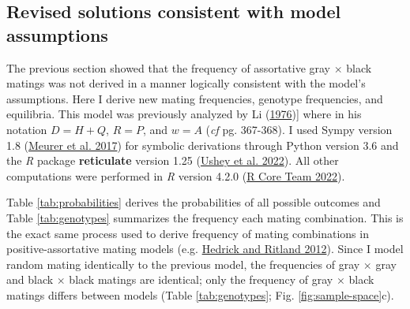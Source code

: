 \documentclass[
]{article}
\begin{document}
\hypertarget{revised-solutions-consistent-with-model-assumptions}{%
\subsection{Revised solutions consistent with model assumptions}\label{revised-solutions-consistent-with-model-assumptions}}

The previous section showed that the frequency of assortative gray \(\times\) black matings was not derived in a manner logically consistent with the model's assumptions. Here I derive new mating frequencies, genotype frequencies, and equilibria. This model was previously analyzed by Li (\protect\hyperlink{ref-li_first_1976}{1976}){]} where in his notation \(D = H + Q\), \(R = P\), and \(w = A\) (\emph{cf} pg. 367-368). I used Sympy version 1.8 (\protect\hyperlink{ref-meurer_sympy:_2017}{Meurer et al. 2017}) for symbolic derivations through Python version 3.6 and the \emph{R} package \textbf{reticulate} version 1.25 (\protect\hyperlink{ref-ushey_reticulate_2022}{Ushey et al. 2022}). All other computations were performed in \emph{R} version 4.2.0 (\protect\hyperlink{ref-r_core_team_r_2022}{R Core Team 2022}).

Table \ref{tab:probabilities} derives the probabilities of all possible outcomes and Table \ref{tab:genotypes} summarizes the frequency each mating combination. This is the exact same process used to derive frequency of mating combinations in positive-assortative mating models (e.g. \protect\hyperlink{ref-hedrick_population_2012}{Hedrick and Ritland 2012}). Since I model random mating identically to the previous model, the frequencies of gray \(\times\) gray and black \(\times\) black matings are identical; only the frequency of gray \(\times\) black matings differs between models (Table \ref{tab:genotypes}; Fig. \ref{fig:sample-space}c).
\end{document}
